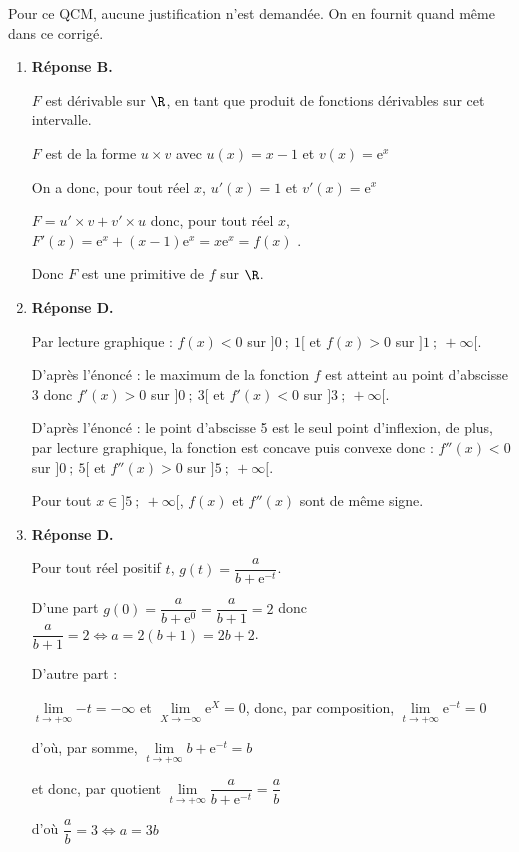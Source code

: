 
\bigskip
Pour ce QCM, aucune justification n'est demandée. On en fournit quand même dans ce corrigé.
\begin{enumerate}
\item \textbf{Réponse B.}

$F$ est dérivable sur $\R $, en tant que produit de fonctions dérivables sur cet intervalle.

$F$ est de la forme $u \times v$ avec $u(x)=x-1$ et $v(x)=\mathrm{e}^x$

On a donc, pour tout réel $x$,  $u'(x)=1$ et $v'(x)	=\mathrm{e}^x$

$F= u'\times v + v'\times u$ donc,  pour tout réel $x$, $F'(x) = \mathrm{e}^x+ (x-1) \mathrm{e}^x = x\mathrm{e}^x=f(x)$ .

Donc $F$ est une primitive de $f$ sur $\R$.
\item \textbf{Réponse D.}

Par lecture graphique : $f(x)<0$ sur $]0~;~1[$ et $f(x)>0$ sur $]1~;~+\infty[$.

D'après l'énoncé : le maximum de la fonction $f$ est atteint au point d'abscisse 3  donc $f'(x)>0$ sur $]0~;~3[$ et $f'(x) <0$ sur $]3~;~+\infty[$.

D'après l'énoncé : le point d'abscisse 5 est le seul point d'inflexion, de plus,  par lecture  graphique,  la fonction est concave puis convexe donc : $f''(x)<0$ sur $]0~;~5[$ et $f''(x) >0$ sur $]5~;~+\infty[$.


Pour tout $x \in ]5~;~+\infty[$, $f(x)$ et $f''(x)$ sont de même signe.

\item \textbf{Réponse D.}

Pour tout réel positif $t$, $g(t)=\dfrac{a}{b+\mathrm{e}^{-t}}$.

D'une part  $g(0)=\dfrac{a}{b+\mathrm{e}^0}=\dfrac{a}{b+1}=2$ donc $\dfrac{a}{b+1}=2 \iff a=2(b+1)=2b+2$.

D'autre part :

$\lim\limits_{t \to +\infty}{-t}=-\infty$ et $\lim\limits_{X\to -\infty}{\mathrm{e}^X}=0$, donc, par composition, $\lim\limits_{t\to +\infty}{ \mathrm{e}^{-t}}=0$

d'où, par somme, $\lim\limits_{t\to +\infty} b+ \mathrm{e}^{-t}=b$

et donc, par quotient $\lim\limits_{t\to +\infty}\dfrac{a}{b+\mathrm{e}^{-t}}=\dfrac{a}{b}$

d'où $\dfrac{a}{b}=3 \Leftrightarrow a=3b$


\end{enumerate}
